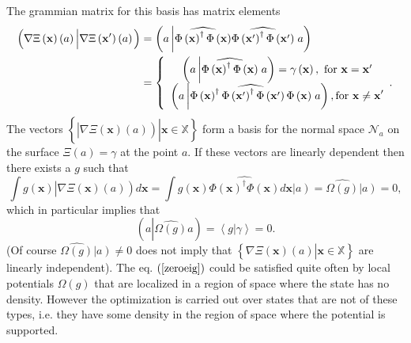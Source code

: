 \documentclass[aps,preprint]{revtex4}%
\begin{document}
The grammian matrix for this basis has matrix elements
\begin{align}
\left(  \overset{}{\nabla\Xi\left(  \mathbf{x}\right)  \left(  a\right)
}\left\vert \overset{}{\nabla\Xi\left(  \mathbf{x}^{\prime}\right)  \left(
a\right)  }\right.  \right)   &  =\left(  a\left\vert \widehat{\Phi\left(
\mathbf{x}\right)  ^{\dagger}\Phi\left(  \mathbf{x}\right)  }\widehat{\Phi
\left(  \mathbf{x}^{\prime}\right)  ^{\dagger}\Phi\left(  \mathbf{x}^{\prime
}\right)  }\right.  a\right) \nonumber\\
&  =\left\{
\begin{array}
[c]{c}%
\left(  a\left\vert \widehat{\Phi\left(  \mathbf{x}\right)  ^{\dagger}%
\Phi\left(  \mathbf{x}\right)  }\right.  a\right)  =\gamma\left(
\mathbf{x}\right)  ,\text{ for }\mathbf{x=x}^{\prime}\\
\left(  a\left\vert \widehat{\Phi\left(  \mathbf{x}\right)  ^{\dagger}%
\Phi\left(  \mathbf{x}^{\prime}\right)  ^{\dagger}\Phi\left(  \mathbf{x}%
^{\prime}\right)  \Phi\left(  \mathbf{x}\right)  }\right.  a\right)
,\text{for }\mathbf{x\neq x}^{\prime}%
\end{array}
.\right.
\end{align}
The vectors $\left\{  \left.  \overset{}{\left\vert \overset{}{\nabla
\Xi\left(  \mathbf{x}\right)  \left(  a\right)  }\right)  }\right\vert
\mathbf{x\in}\mathbb{X}\right\}  $ form a basis for the normal space
$\mathcal{N}_{a}$ on the surface $\Xi\left(  a\right)  =\gamma$ at the point
$a.$ If these vectors are linearly dependent then there exists a $g$ such
that
\begin{equation}
\int g\left(  \mathbf{x}\right)  \left\vert \overset{}{\nabla\Xi\left(
\mathbf{x}\right)  \left(  a\right)  }\right)  d\mathbf{x}=\int g\left(
\mathbf{x}\right)  \widehat{\Phi\left(  \mathbf{x}\right)  ^{\dagger}%
\Phi\left(  \mathbf{x}\right)  }d\mathbf{x}\left\vert \overset{}{a}\right)
=\widehat{\Omega\left(  g\right)  }\left\vert \overset{}{a}\right)  =0,
\label{roeig}%
\end{equation}
which in particular implies that
\begin{equation}
\left(  a\left\vert \widehat{\Omega\left(  g\right)  }\right.  a\right)
=\left\langle \left.  g\right\vert \gamma\right\rangle =0.
\end{equation}
(Of course $\widehat{\Omega\left(  g\right)  }\left\vert \overset{}{a}\right)
\neq0$ does not imply that $\left\{  \left.  \overset{}{\nabla\Xi\left(
\mathbf{x}\right)  \left(  a\right)  }\right\vert \mathbf{x\in}\mathbb{X}%
\right\}  $ are linearly independent). The eq. $\left(  \ref{zeroeig}\right)
$ could be satisfied quite often by local potentials $\Omega\left(  g\right)
$ that are localized in a region of space where the state has no density.
However the optimization is carried out over states that are not of these
types, i.e. they have some density in the region of space where the potential
is supported.
\end{document}
